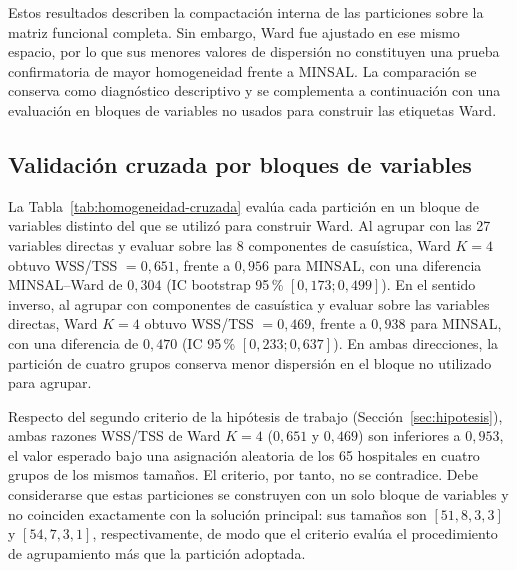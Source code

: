 Estos resultados describen la compactación interna de las particiones sobre la
matriz funcional completa. Sin embargo, Ward fue ajustado en ese mismo espacio,
por lo que sus menores valores de dispersión no constituyen una prueba
confirmatoria de mayor homogeneidad frente a MINSAL. La comparación se conserva
como diagnóstico descriptivo y se complementa a continuación con una evaluación
en bloques de variables no usados para construir las etiquetas Ward.

\subsection{Validación cruzada por bloques de variables}
\label{sec:res-homogeneidad-cruzada}

La Tabla~\ref{tab:homogeneidad-cruzada} evalúa cada partición en un bloque de
variables distinto del que se utilizó para construir Ward. Al agrupar con las 27
variables directas y evaluar sobre las 8 componentes de casuística, Ward $K=4$
obtuvo WSS/TSS $=0{,}651$, frente a $0{,}956$ para MINSAL, con una diferencia
MINSAL--Ward de $0{,}304$ (IC bootstrap 95\,\% $[0{,}173;0{,}499]$). En el
sentido inverso, al agrupar con componentes de casuística y evaluar sobre las
variables directas, Ward $K=4$ obtuvo WSS/TSS $=0{,}469$, frente a $0{,}938$
para MINSAL, con una diferencia de $0{,}470$ (IC 95\,\%
$[0{,}233;0{,}637]$). En ambas direcciones, la partición de cuatro grupos
conserva menor dispersión en el bloque no utilizado para agrupar.

Respecto del segundo criterio de la hipótesis de trabajo
(Sección~\ref{sec:hipotesis}), ambas razones WSS/TSS de Ward $K=4$ ($0{,}651$ y
$0{,}469$) son inferiores a $0{,}953$, el valor esperado bajo una asignación
aleatoria de los 65 hospitales en cuatro grupos de los mismos tamaños. El
criterio, por tanto, no se contradice. Debe considerarse que estas particiones
se construyen con un solo bloque de variables y no coinciden exactamente con la
solución principal: sus tamaños son $[51,8,3,3]$ y $[54,7,3,1]$,
respectivamente, de modo que el criterio evalúa el procedimiento de
agrupamiento más que la partición adoptada.

